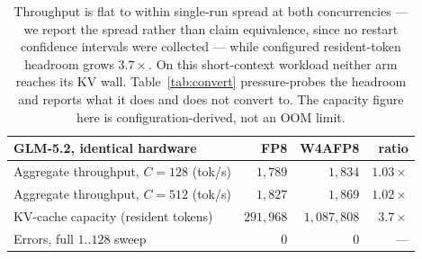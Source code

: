 \documentclass[11pt]{article}
\renewcommand{\_}{\WCorigunderscore\allowbreak}
\begin{document}
\begin{table}[htbp]\centering\small
\begin{tabular}{lrrr}
\toprule
GLM-5.2, identical hardware & FP8 & W4AFP8 & ratio\\
\midrule
Aggregate throughput, $C{=}128$ (tok/s) & $1{,}789$ & $1{,}834$ & $1.03\times$\\
Aggregate throughput, $C{=}512$ (tok/s) & $1{,}827$ & $1{,}869$ & $1.02\times$\\
KV-cache capacity (resident tokens)     & $291{,}968$ & $1{,}087{,}808$ & $3.7\times$\\
Errors, full $1..128$ sweep             & $0$ & $0$ & ---\\
\bottomrule
\end{tabular}
\caption{Throughput is flat to within single-run spread at both
concurrencies --- we report the spread rather than claim equivalence,
since no restart confidence intervals were collected --- while
configured resident-token headroom grows $3.7\times$. On this
short-context workload neither arm reaches its KV wall.
Table~\ref{tab:convert} pressure-probes the headroom and reports what it
does and does not convert to. The capacity figure here is
configuration-derived, not an OOM limit.}
\label{tab:capacity}
\end{table}
\end{document}
